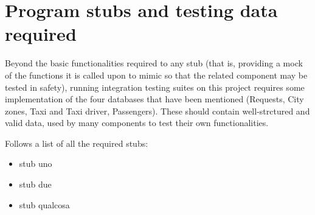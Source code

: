 \chapter{Program stubs and testing data required}
Beyond the basic functionalities required to any stub (that is, providing a mock of the functions it is called upon to mimic so that the related component may be tested in safety), running integration testing suites on this project requires some implementation of the four databases that have been mentioned (Requests, City zones, Taxi and Taxi driver, Passengers). These should contain well-strctured and valid data, used by many components to test their own functionalities.

Follows a list of all the required stubs:
\begin{itemize}
\item stub uno
\item stub due
\item stub qualcosa
\end{itemize}
